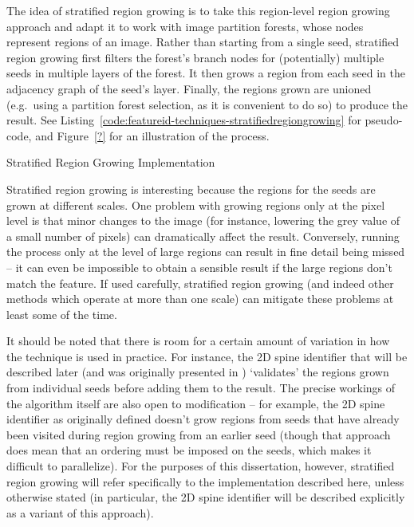 The idea of stratified region growing is to take this region-level region growing approach and adapt it to work with image partition forests, whose nodes represent regions of an image. Rather than starting from a single seed, stratified region growing first filters the forest's branch nodes for (potentially) multiple seeds in multiple layers of the forest. It then grows a region from each seed in the adjacency graph of the seed's layer. Finally, the regions grown are unioned (e.g.~using a partition forest selection, as it is convenient to do so) to produce the result. See Listing~\ref{code:featureid-techniques-stratifiedregiongrowing} for pseudo-code, and Figure~\ref{?} for an illustration of the process.

\begin{stulisting}[p]
\caption{Stratified Region Growing Implementation}
\label{code:featureid-techniques-stratifiedregiongrowing}

\end{stulisting}

Stratified region growing is interesting because the regions for the seeds are grown at different scales. One problem with growing regions only at the pixel level is that minor changes to the image (for instance, lowering the grey value of a small number of pixels) can dramatically affect the result. Conversely, running the process only at the level of large regions can result in fine detail being missed -- it can even be impossible to obtain a sensible result if the large regions don't match the feature. If used carefully, stratified region growing (and indeed other methods which operate at more than one scale) can mitigate these problems at least some of the time.

It should be noted that there is room for a certain amount of variation in how the technique is used in practice. For instance, the 2D spine identifier that will be described later (and was originally presented in \cite{gvcispa09}) `validates' the regions grown from individual seeds before adding them to the result. The precise workings of the algorithm itself are also open to modification -- for example, the 2D spine identifier as originally defined doesn't grow regions from seeds that have already been visited during region growing from an earlier seed (though that approach does mean that an ordering must be imposed on the seeds, which makes it difficult to parallelize). For the purposes of this dissertation, however, stratified region growing will refer specifically to the implementation described here, unless otherwise stated (in particular, the 2D spine identifier will be described explicitly as a variant of this approach).

